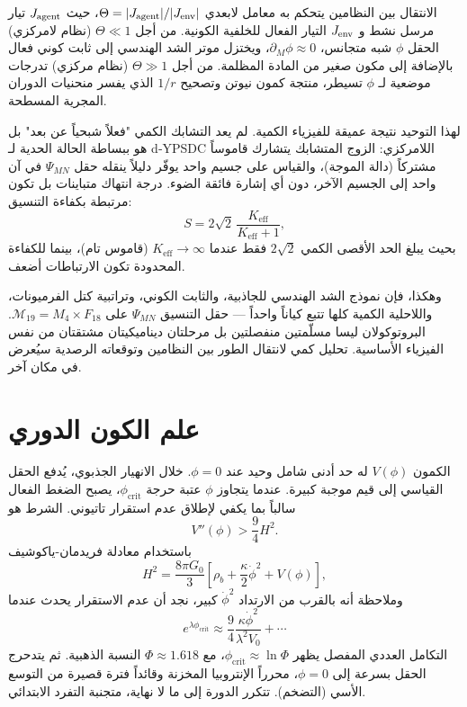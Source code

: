 \documentclass[12pt,a4paper]{article}
\begin{document}
	الانتقال بين النظامين يتحكم به معامل لابعدي \(\Theta = |J_{\rm agent}| / |J_{\rm env}|\)، حيث \(J_{\rm agent}\) تيار مرسل نشط و \(J_{\rm env}\) التيار الفعال للخلفية الكونية. من أجل \(\Theta\ll1\) (نظام لامركزي) الحقل \(\phi\) شبه متجانس، \(\partial_M\phi\approx0\)، ويختزل موتر الشد الهندسي إلى ثابت كوني فعال بالإضافة إلى مكون صغير من المادة المظلمة. من أجل \(\Theta\gg1\) (نظام مركزي) تدرجات موضعية لـ \(\phi\) تسيطر، منتجة كمون نيوتن وتصحيح \(1/r\) الذي يفسر منحنيات الدوران المجرية المسطحة.
	
	لهذا التوحيد نتيجة عميقة للفيزياء الكمية. لم يعد التشابك الكمي "فعلاً شبحياً عن بعد" بل هو ببساطة الحالة الحدية لـ d‑YPSDC اللامركزي: الزوج المتشابك يتشارك قاموساً مشتركاً (دالة الموجة)، والقياس على جسيم واحد يوفّر دليلاً ينقله حقل \(\Psi_{MN}\) في آن واحد إلى الجسيم الآخر، دون أي إشارة فائقة الضوء. درجة انتهاك متباينات بل تكون مرتبطة بكفاءة التنسيق:
	\begin{equation}
		S = 2\sqrt{2}\,\frac{K_{\mathrm{eff}}}{K_{\mathrm{eff}}+1},
		\label{eq:bell-eff}
	\end{equation}
	بحيث يبلغ الحد الأقصى الكمي \(2\sqrt{2}\) فقط عندما \(K_{\mathrm{eff}}\to\infty\) (قاموس تام)، بينما للكفاءة المحدودة تكون الارتباطات أضعف.
	
	وهكذا، فإن نموذج الشد الهندسي للجاذبية، والثابت الكوني، وتراتبية كتل الفرميونات، واللاحلية الكمية كلها تتبع كياناً واحداً — حقل التنسيق \(\Psi_{MN}\) على \(\mathcal{M}_{19}=M_4\times F_{18}\). البروتوكولان ليسا مسلّمتين منفصلتين بل مرحلتان ديناميكيتان مشتقتان من نفس الفيزياء الأساسية. تحليل كمي لانتقال الطور بين النظامين وتوقعاته الرصدية سيُعرض في مكان آخر.
	
	\section{علم الكون الدوري}
	الكمون \(V(\phi)\) له حد أدنى شامل وحيد عند \(\phi=0\). خلال الانهيار الجذبوي، يُدفع الحقل القياسي إلى قيم موجبة كبيرة. عندما يتجاوز \(\phi\) عتبة حرجة \(\phi_{\mathrm{crit}}\)، يصبح الضغط الفعال سالباً بما يكفي لإطلاق عدم استقرار تاتيوني. الشرط هو
	\[
	V''(\phi) > \frac{9}{4} H^2.
	\]
	باستخدام معادلة فريدمان-ياكوشيف
	\[
	H^2 = \frac{8\pi G_0}{3} \left[ \rho_b + \frac{\kappa}{2}\dot\phi^2 + V(\phi) \right],
	\]
	وملاحظة أنه بالقرب من الارتداد \(\dot\phi^2\) كبير، نجد أن عدم الاستقرار يحدث عندما
	\[
	e^{\lambda\phi_{\mathrm{crit}}} \approx \frac{9}{4} \frac{\kappa\dot\phi^2}{\lambda^2 V_0} + \cdots
	\]
	التكامل العددي المفصل يظهر \(\phi_{\mathrm{crit}} \approx \ln\Phi\)، مع \(\Phi \approx 1.618\) النسبة الذهبية. ثم يتدحرج الحقل بسرعة إلى \(\phi=0\)، محرراً الإنتروبيا المخزنة وقائداً فترة قصيرة من التوسع الأسي (التضخم). تتكرر الدورة إلى ما لا نهاية، متجنبة التفرد الابتدائي.
	
\end{document}
